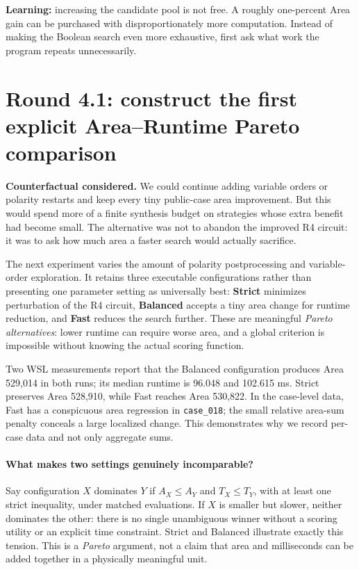\documentclass[a4paper,10pt]{article}
\theoremstyle{definition}
\theoremstyle{remark}
\begin{document}
\begin{tcolorbox}[colback=ResearchRose!20,colframe=ResearchRose,title=Decision after Round 4]
\textbf{Learning:} increasing the candidate pool is not free. A roughly one-percent Area gain can be purchased with disproportionately more computation. Instead of making the Boolean search even more exhaustive, first ask what work the program repeats unnecessarily.
\end{tcolorbox}

\section{Round 4.1: construct the first explicit Area--Runtime Pareto comparison}
\textbf{Counterfactual considered.} We could continue adding variable orders or polarity restarts and keep every tiny public-case area improvement. But this would spend more of a finite synthesis budget on strategies whose extra benefit had become small. The alternative was not to abandon the improved R4 circuit: it was to ask how much area a faster search would actually sacrifice.

The next experiment varies the amount of polarity postprocessing and variable-order exploration. It retains three executable configurations rather than presenting one parameter setting as universally best: \textbf{Strict} minimizes perturbation of the R4 circuit, \textbf{Balanced} accepts a tiny area change for runtime reduction, and \textbf{Fast} reduces the search further. These are meaningful \emph{Pareto alternatives}: lower runtime can require worse area, and a global criterion is impossible without knowing the actual scoring function.

Two WSL measurements report that the Balanced configuration produces Area 529,014 in both runs; its median runtime is 96.048 and 102.615 ms. Strict preserves Area 528,910, while Fast reaches Area 530,822. In the case-level data, Fast has a conspicuous area regression in \texttt{case\_018}; the small relative area-sum penalty conceals a large localized change. This demonstrates why we record per-case data and not only aggregate sums.

\paragraph{What makes two settings genuinely incomparable?} Say configuration $X$ dominates $Y$ if $A_X\le A_Y$ and $T_X\le T_Y$, with at least one strict inequality, under matched evaluations. If $X$ is smaller but slower, neither dominates the other: there is no single unambiguous winner without a scoring utility or an explicit time constraint. Strict and Balanced illustrate exactly this tension. This is a \emph{Pareto} argument, not a claim that area and milliseconds can be added together in a physically meaningful unit.
\end{document}
